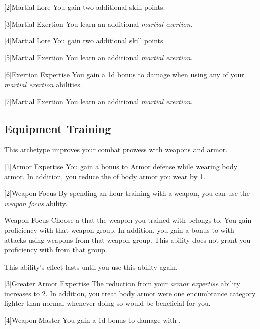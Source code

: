         [2]{Martial Lore} You gain two additional skill points.

        [3]{Martial Exertion}
        You learn an additional \textit{martial exertion}.

        [4]{Martial Lore} You gain two additional skill points.

        [5]{Martial Exertion} 
        You learn an additional \textit{martial exertion}.

        [6]{Exertion Expertise} You gain a \plus1d bonus to damage when using any of your \textit{martial exertion} abilities.

        [7]{Martial Exertion}
        You learn an additional \textit{martial exertion}.

    \subsection{Equipment Training}
        This archetype improves your combat prowess with weapons and armor.

        [1]{Armor Expertise}
        You gain a  bonus to Armor defense while wearing body armor.
        In addition, you reduce the  of body armor you wear by 1.

        [2]{Weapon Focus} By spending an hour training with a weapon, you can use the \textit{weapon focus} ability.
        \begin{ability}{Weapon Focus}
            Choose a  that the weapon you trained with belongs to.
            You gain proficiency with that weapon group.
            In addition, you gain a  bonus to  with attacks using weapons from that weapon group.
            This ability does not grant you proficiency with  from that group.

            This ability's effect lasts until you use this ability again.
        \end{ability}

        [3]{Greater Armor Expertise}
        The  reduction from your \textit{armor expertise} ability increases to 2.
        In addition, you treat body armor were one encumbrance category lighter than normal whenever doing so would be beneficial for you.

        [4]{Weapon Master}
        You gain a \plus1d bonus to damage with .

